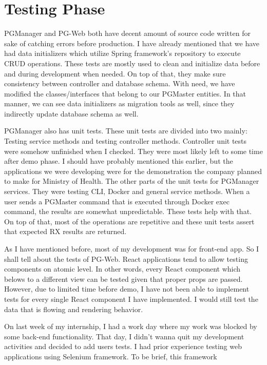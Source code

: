 \section{Testing Phase}
PGManager and PG-Web both have decent amount of source code written for sake 
of catching errors before production. I have already mentioned that we have 
had data initializers which utilize Spring framework's repository to execute 
CRUD operations. These tests are mostly used to clean and initialize data 
before and during development when needed. On top of that, they make sure 
consistency between controller and database schema. With need, we have 
modified the classes/interfaces that belong to our PGMaster entities. In that 
manner, we can see data initializers as migration tools as well, since they 
indirectly update database schema as well.
\par
PGManager also has unit tests. These unit tests are divided into two mainly: 
Testing service methods and testing controller methods. Controller unit tests 
were somehow unfinished when I checked. They were most likely left to some 
time after demo phase. I should have probably mentioned this earlier, but the 
applications we were developing were for the demonstration the company planned 
to make for Ministry of Health. The other parts of the unit tests for PGManager 
services. They were testing CLI, Docker and general service methods. When a 
user sends a PGMaster command that is executed through Docker exec command, 
the results are somewhat unpredictable. These tests help with that. On top of 
that, most of the operations are repetitive and these unit tests assert that 
expected RX results are returned.
\par
As I have mentioned before, most of my development was for front-end app. So I 
shall tell about the tests of PG-Web. React applications tend to allow testing 
components on atomic level. In other words, every React component which belows 
to a different view can be tested given that proper props are passed. However, 
due to limited time before demo, I have not been able to implement tests for 
every single React component I have implemented. I would still test the data 
that is flowing and rendering behavior.
\par
On last week of my internship, I had a work day where my work was blocked by 
some back-end functionality. That day, I didn't wanna quit my development 
activities and decided to add users tests. I had prior experience testing 
web applications using Selenium framework. To be brief, this framework 

